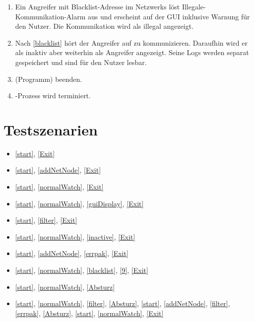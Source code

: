 \begin{enumerate}
  \item {}Ein Angreifer mit Blacklist-Adresse im Netzwerks löst Illegale-Kommunikation-Alarm aus und erscheint auf der GUI inklusive Warnung für den Nutzer. Die Kommunikation wird als illegal angezeigt.
  \item {}Nach \ref{blacklist} hört der Angreifer auf zu kommunizieren. Daraufhin wird er als inaktiv aber weiterhin als Angreifer angezeigt. Seine Logs werden separat gespeichert und sind für den Nutzer lesbar.
  \item {} \programname (Programm) beenden.
  \item {} \programname-Prozess wird terminiert.
\end{enumerate}

\section{Testszenarien}

\begin{itemize}
  \item \ref{start}, \ref{Exit}
  \item \ref{start}, \ref{addNetNode}, \ref{Exit}
  \item \ref{start}, \ref{normalWatch}, \ref{Exit}
  \item \ref{start}, \ref{normalWatch}, \ref{guiDisplay}, \ref{Exit}
  \item \ref{start}, \ref{filter}, \ref{Exit}
  \item \ref{start}, \ref{normalWatch}, \ref{inactive}, \ref{Exit}
  \item \ref{start}, \ref{addNetNode}, \ref{errpak}, \ref{Exit}
  \item \ref{start}, \ref{normalWatch}, \ref{blacklist}, \ref{9}, \ref{Exit}
  \item \ref{start}, \ref{normalWatch}, \ref{Absturz}
  \item \ref{start}, \ref{normalWatch}, \ref{filter}, \ref{Absturz}, \ref{start}, \ref{addNetNode}, \ref{filter}, \ref{errpak}, \ref{Absturz}, \ref{start}, \ref{normalWatch}, \ref{Exit}
\end{itemize}